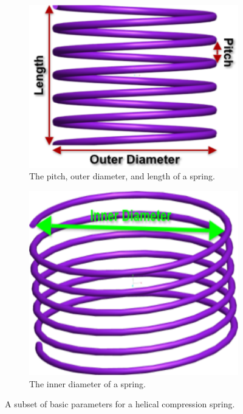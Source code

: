 \documentclass[10pt]{article}
\begin{document}
		\begin{figure}[H]
			\begin{subfigure}{.5\textwidth}
				\centering
				\includegraphics[scale=.17]{Spring_Description.png}
				\caption{The pitch, outer diameter, and length of a spring.}
				\label{fig:Description1}
			\end{subfigure}%
			\begin{subfigure}{.5\textwidth}
				  \centering
		 		\includegraphics[scale=.155]{Spring_Description2.png}
				\caption{The inner diameter of a spring.}
				  \label{fig:Description2}
			\end{subfigure}
			 \label{fig:Descriptions}
		  \caption{A subset of basic parameters for a helical compression spring.}
		\end{figure}
		
\end{document}
